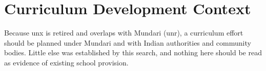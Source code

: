 \documentclass[12pt]{article}
\begin{document}
\section{Curriculum Development Context}
Because unx is retired and overlaps with Mundari (unr), a curriculum effort should be planned under Mundari and with Indian authorities and community bodies. Little else was established by this search, and nothing here should be read as evidence of existing school provision.
\end{document}
